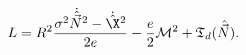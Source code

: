 \begin{equation}
L=R^2\frac{\sigma^2 \dot{\hat{\vec N}}{}^2-\dot{\hat \X}{}^
2}{2e}
-\frac{e}{2}{\cal M}^2+{\mathfrak T}_d(\hat {\vec N}).
\label{adss}
\end{equation}

